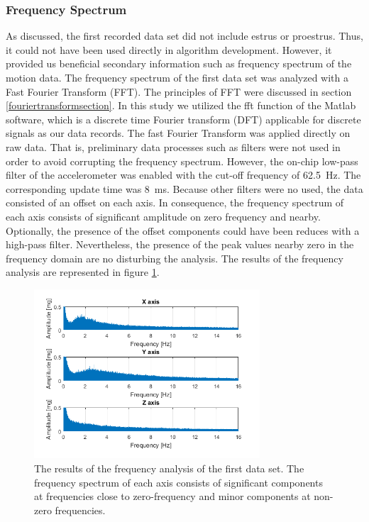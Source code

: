 \documentclass[english,12pt,a4paper,pdftex,elec,utf8]{aaltothesis}
\begin{document}
\subsubsection{Frequency Spectrum}

As discussed, the first recorded data set did not include estrus or proestrus. Thus, it could not have been used directly in algorithm development. However, it provided us beneficial secondary information such as frequency spectrum of the motion data. The frequency spectrum of the first data set was analyzed with a Fast Fourier Transform (FFT). The principles of FFT were discussed in section \ref{fouriertransformsection}. In this study we utilized the fft function of the Matlab software, which is a discrete time Fourier transform (DFT) applicable for discrete signals as our data records. The fast Fourier Transform was applied directly on raw data. That is, preliminary data processes such as filters were not used in order to avoid corrupting the frequency spectrum. However, the on-chip low-pass filter of the accelerometer was enabled with the cut-off frequency of \SI{62.5}{\hertz}. The corresponding update time was \SI{8}{\milli\second}. Because other filters were no used, the data consisted of an offset on each axis. In consequence, the frequency spectrum of each axis consists of significant amplitude on zero frequency and nearby. Optionally, the presence of the offset components could have been reduces with a high-pass filter. Nevertheless, the presence of the peak values nearby zero in the frequency domain are no disturbing the analysis. The results of the frequency analysis are represented in figure \ref{frequenyspectrumfigure}. 


\begin{figure}[h]
\centering
\includegraphics[width = 0.75\textwidth]{figures/frequencyanalysis2.png}
\caption{The results of the frequency analysis of the first data set. The frequency spectrum of each axis consists of significant components at frequencies close to zero-frequency and minor components at non-zero frequencies.} \label{frequenyspectrumfigure}
\end{figure}
\end{document}
